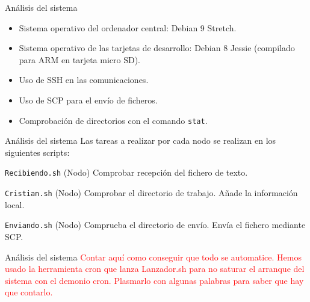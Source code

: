 \documentclass[aspectratio=169]{beamer}
\begin{document}
\begin{frame}{Análisis del sistema}
	\begin{itemize}
		\item Sistema operativo del ordenador central: Debian 9 Stretch.
		\item Sistema operativo de las tarjetas de desarrollo: Debian 8 Jessie (compilado para ARM en tarjeta micro SD).
		\item Uso de SSH en las comunicaciones.
		\item Uso de SCP para el envío de ficheros.
		\item Comprobación de directorios con el comando \texttt{stat}.
	\end{itemize}
\end{frame}

\begin{frame}{Análisis del sistema}
	Las tareas a realizar por cada nodo se realizan en los siguientes scripts:
	\begin{block}{\texttt{Recibiendo.sh} (Nodo)}
		Comprobar recepción del fichero de texto.
	\end{block}
	\begin{block}{\texttt{Cristian.sh} (Nodo)}
		Comprobar el directorio de trabajo.
		Añade la información local.
	\end{block}
	\begin{block}{\texttt{Enviando.sh} (Nodo)}
		Comprueba el directorio de envío.
		Envía el fichero mediante SCP.
	\end{block}
\end{frame}

\begin{frame}{Análisis del sistema}
	\textcolor{red}{Contar aquí como conseguir que todo se automatice. Hemos usado la herramienta cron que lanza Lanzador.sh para no saturar el arranque del sistema con el demonio cron. Plasmarlo con algunas palabras para saber que hay que contarlo.}
\end{frame}
\end{document}
